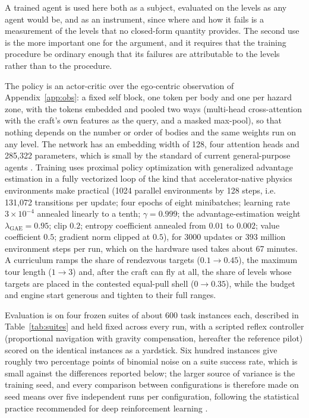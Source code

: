 \documentclass[11pt]{article}
\begin{document}
A trained agent is used here both as a subject, evaluated on the levels as
any agent would be, and as an instrument, since where and how it fails is a
measurement of the levels that no closed-form quantity provides. The second
use is the more important one for the argument, and it requires that the
training procedure be ordinary enough that its failures are attributable to
the levels rather than to the procedure.

The policy is an actor-critic over the ego-centric observation of
Appendix~\ref{app:obs}: a fixed self block, one token per body and one per
hazard zone, with the tokens embedded and pooled two ways (multi-head
cross-attention with the craft's own features as the query, and a masked
max-pool), so that nothing depends on the number or order of bodies and the
same weights run on any level. The network has an embedding width of 128,
four attention heads and 285,322 parameters, which is small by the standard
of current general-purpose agents \cite{lee2025}. Training uses proximal
policy optimization \cite{schulman2017} with generalized advantage
estimation \cite{schulman2016} in a fully vectorized loop of the kind that
accelerator-native physics environments make practical \cite{matthews2025}
(1024 parallel environments by 128 steps, i.e. 131,072 transitions per
update; four epochs of eight minibatches; learning rate $3 \times 10^{-4}$
annealed linearly to a tenth; $\gamma = 0.999$; the advantage-estimation
weight $\lambda_{\mathrm{GAE}} = 0.95$; clip
$0.2$; entropy coefficient annealed from $0.01$ to $0.002$; value
coefficient $0.5$; gradient norm clipped at $0.5$), for 3000 updates or 393
million environment steps per run, which on the hardware used takes about
67 minutes. A curriculum \cite{bengio2009,narvekar2020} ramps the share of
rendezvous targets ($0.1 \to 0.45$), the maximum tour length ($1 \to 3$)
and, after the craft can fly at all, the share of levels whose targets are
placed in the contested equal-pull shell ($0 \to 0.35$), while the budget and
engine start generous and tighten to their full ranges.

Evaluation is on four frozen suites of about 600 task instances each,
described in Table~\ref{tab:suites} and held fixed across every run, with a
scripted reflex controller (proportional navigation with gravity
compensation, hereafter the reference pilot) scored on the identical
instances as a yardstick. Six hundred instances give roughly two percentage
points of binomial noise on a suite success rate, which is small against the
differences reported below; the larger source of variance is the training
seed, and every comparison between configurations is therefore made on seed
means over five independent runs per configuration, following the
statistical practice recommended for deep reinforcement learning
\cite{agarwal2021,henderson2018,colas2018}.
\end{document}
